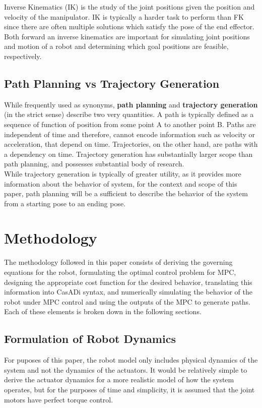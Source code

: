 \documentclass[journal]{IEEEtran}
\begin{document}
Inverse Kinematics (IK) is the study of the joint positions given the position and velocity of the manipulator. IK is typically a harder task to perform than FK since there are often multiple solutions which satisfy the pose of the end effector. \\

Both forward an inverse kinematics are important for simulating joint positions and motion of a robot and determining which goal positions are feasible, respectively.

\subsection{Path Planning vs Trajectory Generation}

While frequently used as synonyms, \textbf{path planning} and \textbf{trajectory generation} (in the strict sense) describe two very quantities. A path is typically defined as a sequence of function of position from some point A to another point B. Paths are independent of time and therefore, cannot encode information such as velocity or acceleration, that depend on time. Trajectories, on the other hand, are paths with a dependency on time. Trajectory generation has substantially larger scope than path planning, and possesses substantial body of research.  \\

While trajectory generation is typically of greater utility, as it provides more information about the behavior of system, for the context and scope of this paper, path planning will be a sufficient to describe the behavior of the system from a starting pose to an ending pose.

\section{Methodology}

The methodology followed in this paper consists of deriving the governing equations for the robot, formulating the optimal control problem for MPC, designing the appropriate cost function for the desired behavior, translating this information into CasADi syntax, and numerically simulating the behavior of the robot under MPC control and using the outputs of the MPC to generate paths. Each of these elements is broken down in the following sections.

\subsection{Formulation of Robot Dynamics}
For puposes of this paper, the robot model only includes physical dynamics of the system and not the dynamics of the actuators. It would be relatively simple to derive the actuator dynamics for a more realistic model of how the system operates, but for the purposes of time and simplicity, it is assumed that the joint motors have perfect torque control. \\
\end{document}
